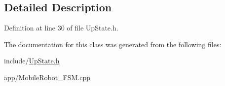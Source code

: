\subsection{Detailed Description}


Definition at line 30 of file Up\+State.\+h.



The documentation for this class was generated from the following files\+:\begin{DoxyCompactItemize}
\item 
include/\mbox{\hyperlink{_up_state_8h}{Up\+State.\+h}}\item 
app/Mobile\+Robot\+\_\+\+F\+S\+M.\+cpp\end{DoxyCompactItemize}
